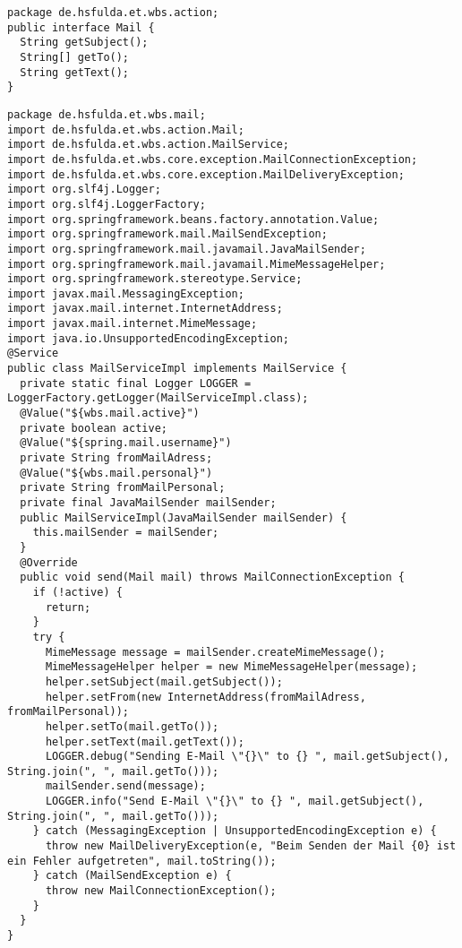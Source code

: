 \begin{lstlisting}[caption={Typ von Objekt, das an die E-Mail Schnittstelle übergeben werden kann.}, label={lst:n_Mail}]
package de.hsfulda.et.wbs.action;
public interface Mail {
  String getSubject();
  String[] getTo();
  String getText();
}
\end{lstlisting}

\begin{lstlisting}[caption={Implementierung der Schnittstelle \code{MailService} in der Komponente \code{mail}.}, label={lst:n_MailServiceImpl}]
package de.hsfulda.et.wbs.mail;
import de.hsfulda.et.wbs.action.Mail;
import de.hsfulda.et.wbs.action.MailService;
import de.hsfulda.et.wbs.core.exception.MailConnectionException;
import de.hsfulda.et.wbs.core.exception.MailDeliveryException;
import org.slf4j.Logger;
import org.slf4j.LoggerFactory;
import org.springframework.beans.factory.annotation.Value;
import org.springframework.mail.MailSendException;
import org.springframework.mail.javamail.JavaMailSender;
import org.springframework.mail.javamail.MimeMessageHelper;
import org.springframework.stereotype.Service;
import javax.mail.MessagingException;
import javax.mail.internet.InternetAddress;
import javax.mail.internet.MimeMessage;
import java.io.UnsupportedEncodingException;
@Service
public class MailServiceImpl implements MailService {
  private static final Logger LOGGER = LoggerFactory.getLogger(MailServiceImpl.class);
  @Value("${wbs.mail.active}")
  private boolean active;
  @Value("${spring.mail.username}")
  private String fromMailAdress;
  @Value("${wbs.mail.personal}")
  private String fromMailPersonal;
  private final JavaMailSender mailSender;
  public MailServiceImpl(JavaMailSender mailSender) {
    this.mailSender = mailSender;
  }
  @Override
  public void send(Mail mail) throws MailConnectionException {
    if (!active) {
      return;
    }
    try {
      MimeMessage message = mailSender.createMimeMessage();
      MimeMessageHelper helper = new MimeMessageHelper(message);
      helper.setSubject(mail.getSubject());
      helper.setFrom(new InternetAddress(fromMailAdress, fromMailPersonal));
      helper.setTo(mail.getTo());
      helper.setText(mail.getText());
      LOGGER.debug("Sending E-Mail \"{}\" to {} ", mail.getSubject(), String.join(", ", mail.getTo()));
      mailSender.send(message);
      LOGGER.info("Send E-Mail \"{}\" to {} ", mail.getSubject(), String.join(", ", mail.getTo()));
    } catch (MessagingException | UnsupportedEncodingException e) {
      throw new MailDeliveryException(e, "Beim Senden der Mail {0} ist ein Fehler aufgetreten", mail.toString());
    } catch (MailSendException e) {
      throw new MailConnectionException();
    }
  }
}
\end{lstlisting}
